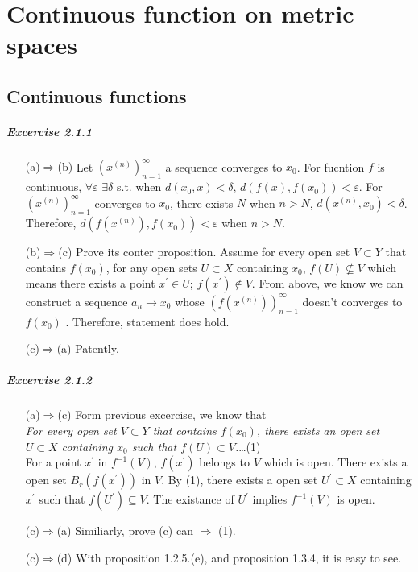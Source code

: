 \chapter{Continuous function on metric spaces}
\section{Continuous functions}
\paragraph{Excercise 2.1.1}
\begin{itemize}
\item[(a)$\Rightarrow$(b)]Let $(x^{(n)})_{n=1}^{\infty}$ a sequence converges to $x_{0}$. For fucntion $f$ is continuous, $\forall \varepsilon$ $\exists \delta$ s.t. when $d(x_{0},x)<\delta$, $d(f(x),f(x_{0}))<\varepsilon$. For $(x^{(n)})_{n=1}^{\infty}$ converges to $x_{0}$, there exists $N$ when $n>N$, $d(x^{(n)},x_{0})<\delta$. Therefore, $d(f(x^{(n)}),f(x_{0}))<\varepsilon$ when $n>N$.
\item[(b)$\Rightarrow$(c)] Prove its conter proposition. Assume for every open set $V \subset Y$ that contains $f(x_{0})$, for any open sets $U \subset X$ containing $x_{0}$, $f(U)\nsubseteq V$ which means there exists a point $x^\prime\in U$; $f(x^\prime)\notin V$. From above, we know we can construct a sequence $a_{n}\rightarrow x_{0}$ whose $(f(x^{(n)}))_{n=1}^{\infty}$ doesn't converges to $f(x_{0})$ \Lightning. Therefore, statement does hold.
\item[(c)$\Rightarrow$(a)]
Patently.
\end{itemize}
\paragraph{Excercise 2.1.2}
\begin{itemize}
\item[(a)$\Rightarrow$(c)] Form previous excercise, we know that\\ {\it For every open set $V \subset Y$ that contains $f(x_{0})$, there exists an open set $U \subset X$ containing $x_{0}$ such that $f(U) \subset V$.}\dots(1)
\\
For a point $x^\prime$ in $f^{-1}(V)$, $f(x^\prime)$ belongs to $V$ which is open. There exists a open set $B_{r}(f(x^\prime))$ in $V$. By (1), there exists a open set $U^\prime \subset X$ containing $x^\prime$ such that $f(U^\prime) \subseteq V$. The existance of $U^\prime$ implies $f^{-1}(V)$ is open.
\item[(c)$\Rightarrow$(a)] Similiarly, prove (c) can $\Rightarrow$ (1).
\item[(c)$\Rightarrow$(d)]With proposition 1.2.5.(e), and proposition 1.3.4, it is easy to see. 
\end{itemize}
